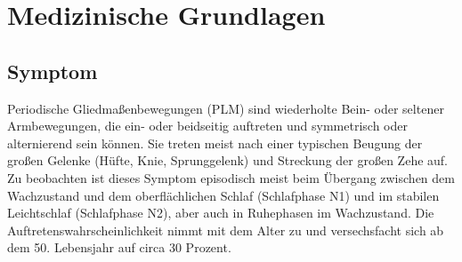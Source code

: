 
\chapter{Medizinische Grundlagen}\label{chap:Medizinische_Grundlagen}
\section{Symptom}
Periodische Gliedmaßenbewegungen (\acrshort{PLM}) sind wiederholte Bein- oder seltener Armbewegungen, die ein- oder beidseitig auftreten und symmetrisch oder alternierend sein können. Sie treten meist nach einer typischen Beugung der großen Gelenke (Hüfte, Knie, Sprunggelenk) und Streckung der großen Zehe auf. Zu beobachten ist dieses Symptom episodisch meist beim Übergang zwischen dem Wachzustand und dem oberflächlichen Schlaf (Schlafphase N1) und im stabilen Leichtschlaf (Schlafphase N2), aber auch in Ruhephasen im Wachzustand. Die Auftretenswahrscheinlichkeit nimmt mit dem Alter zu und versechsfacht sich ab dem 50. Lebensjahr auf circa 30 Prozent. \cite{PDS}


